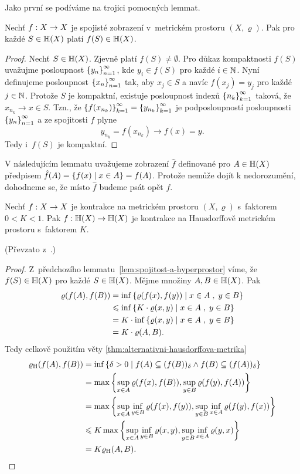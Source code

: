 Jako první se podíváme na trojici pomocných lemmat.
\begin{lemma}\label{lem:spojitost-a-hyperprostor}
    Nechť $f:X \rightarrow X$ je spojisté zobrazení v~metrickém prostoru $(X,\varrho)$. Pak pro každé $S\in\mathbb{H}(X)$ platí $f(S)\in\mathbb{H}(X)$.
\end{lemma}
\begin{proof}
    Nechť $S\in\mathbb{H}(X)$. Zjevně platí $f(S)\neq\emptyset$. Pro důkaz kompaktnosti $f(S)$ uvažujme posloupnost $\left\{y_n\right\}_{n=1}^\infty$, kde $y_i\in f(S)$ pro každé $i\in\mathbb{N}$. Nyní definujeme posloupnost $\left\{x_n\right\}_{n=1}^\infty$ tak, aby $x_j\in S$ a navíc $f(x_j)=y_j$ pro každé $j\in\mathbb{N}$. Protože $S$ je kompaktní, existuje posloupnost indexů $\left\{n_k\right\}_{k=1}^\infty$ taková, že $x_{n_k}\to x\in S$. Tzn., že $\left\{f(x_{n_k})\right\}_{k=1}^\infty=\left\{y_{n_k}\right\}_{k=1}^\infty$ je podposloupností posloupnosti $\left\{y_n\right\}_{n=1}^\infty$ a ze spojitosti $f$ plyne
    \[y_{n_k}=f(x_{n_k})\to f(x)=y.\]
    Tedy i~$f(S)$ je kompaktní.
\end{proof}
V následujícím lemmatu uvažujeme zobrazení $\mathit{\hat{f}}$ definované pro $A\in\mathbb{H}(X)$ předpisem $\mathit{\hat{f}}(A)=\left\{f(x)\mid x\in A\right\}=f(A)$. Protože nemůže dojít k nedorozumění, dohodneme se, že místo $\mathit{\hat{f}}$ budeme psát opět $f$.
\begin{lemma}\label{lem:kontrakce-a-hyperprostor}
    Nechť $f:X \rightarrow X$ je kontrakce na metrickém prostoru $(X,\varrho)$ s~faktorem $0<K<1$. Pak $f:\mathbb{H}(X) \rightarrow \mathbb{H}(X)$ je kontrakce na Hausdorffově metrickém prostoru s~faktorem $K$.
\end{lemma}
(Převzato z~\citep[str. 79]{Barnsley1993}.)
\begin{proof}
    Z~předchozího lemmatu~\ref{lem:spojitost-a-hyperprostor} víme, že $f(S)\in\mathbb{H}(X)$ pro každé $S\in\mathbb{H}(X)$. Mějme množiny $A,B\in\mathbb{H}(X)$. Pak
    \begin{align*}
        \varrho(f(A),f(B))&=\inf\left\{\varrho(f(x),f(y))\mid x\in A\;,\;y\in B\right\}\\
        &\leqslant\inf\left\{K\cdot\varrho(x,y)\mid x\in A\;,\;y\in B\right\}\\
        &=K\cdot\inf\left\{\varrho(x,y)\mid x\in A\;,\;y\in B\right\}\\
        &=K\cdot\varrho(A,B).
    \end{align*}
    Tedy celkově použitím věty \ref{thm:alternativni-hausdorffova-metrika}
    \begin{align*}
        \varrho_\textup{H}(f(A),f(B))&=\inf\left\{\delta>0\mid f(A)\subseteq(f(B))_\delta\land f(B)\subseteq(f(A))_\delta\right\}\\
        &=\max\left\{\sup_{x\in A}\varrho(f(x),f(B)),\sup_{y\in B}\varrho(f(y),f(A))\right\}\\
        &=\max\left\{\sup_{x\in A}\inf_{y\in B}\varrho(f(x),f(y)),\sup_{y\in B}\inf_{x\in A}\varrho(f(y),f(x))\right\}\\
        &\leqslant K\max\left\{\sup_{x\in A}\inf_{y\in B}\varrho(x,y),\sup_{y\in B}\inf_{x\in A}\varrho(y,x)\right\}\\
        &=K\varrho_\textup{H}(A,B).
    \end{align*}
\end{proof}
